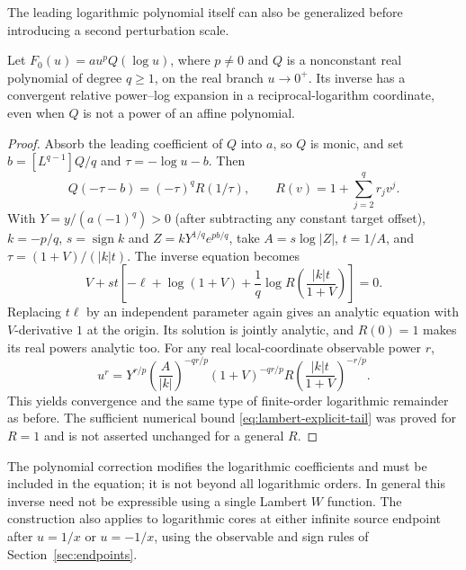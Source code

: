 The leading logarithmic polynomial itself can also be generalized before introducing a second perturbation scale.

\begin{corollary}
\label{cor:polynomial-log-core}
Let $F_0(u)=a u^p Q(\log u)$, where $p\ne0$ and $Q$ is a nonconstant real polynomial of degree $q\ge1$, on the real branch $u\to0^+$. Its inverse has a convergent relative power--log expansion in a reciprocal-logarithm coordinate, even when $Q$ is not a power of an affine polynomial.
\end{corollary}
\begin{proof}
Absorb the leading coefficient of $Q$ into $a$, so $Q$ is monic, and set $b=[L^{q-1}]Q/q$ and $\tau=-\log u-b$. Then
\[
 Q(-\tau-b)=(-\tau)^q R(1/\tau),\qquad
 R(v)=1+\sum_{j=2}^q r_jv^j.
\]
With $Y=y/(a(-1)^q)>0$ (after subtracting any constant target offset), $k=-p/q$, $s=\operatorname{sign}k$ and $Z=kY^{1/q}e^{pb/q}$, take $A=s\log|Z|$, $t=1/A$, and $\tau=(1+V)/(|k|t)$. The inverse equation becomes
\begin{equation}
 V+s t\left[-\ell+\log(1+V)
 +\frac1q\log R\left(\frac{|k|t}{1+V}\right)\right]=0.
 \label{eq:polynomial-log-normalized}
\end{equation}
Replacing $t\ell$ by an independent parameter again gives an analytic equation with $V$-derivative $1$ at the origin. Its solution is jointly analytic, and $R(0)=1$ makes its real powers analytic too. For any real local-coordinate observable power $r$,
\[
 u^r=Y^{r/p}\left(\frac{A}{|k|}\right)^{-qr/p}
 (1+V)^{-qr/p}
 R\left(\frac{|k|t}{1+V}\right)^{-r/p}.
\]
This yields convergence and the same type of finite-order logarithmic remainder as before. The sufficient numerical bound \eqref{eq:lambert-explicit-tail} was proved for $R=1$ and is not asserted unchanged for a general $R$.
\end{proof}

The polynomial correction modifies the logarithmic coefficients and must be included in the equation; it is not beyond all logarithmic orders. In general this inverse need not be expressible using a single Lambert $W$ function. The construction also applies to logarithmic cores at either infinite source endpoint after $u=1/x$ or $u=-1/x$, using the observable and sign rules of Section~\ref{sec:endpoints}.

